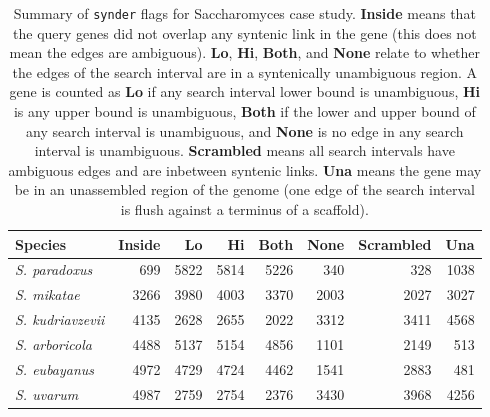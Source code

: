 \begin{table}[!h]
  \centering
  \caption{Summary of {\tt synder} flags for Saccharomyces case study.
  \textbf{Inside} means that the query genes did not overlap any syntenic link
  in the gene (this does not mean the edges are ambiguous).  \textbf{Lo},
  \textbf{Hi}, \textbf{Both}, and \textbf{None} relate to whether the edges of
  the search interval are in a syntenically unambiguous region. A gene is
  counted as \textbf{Lo} if any search interval lower bound is unambiguous,
  \textbf{Hi} is any upper bound is unambiguous, \textbf{Both} if the lower and
  upper bound of any search interval is unambiguous, and \textbf{None} is no
  edge in any search interval is unambiguous.  \textbf{Scrambled} means all
  search intervals have ambiguous edges and are inbetween syntenic links.
  \textbf{Una} means the gene may be in an unassembled region of the genome
  (one edge of the search interval is flush against a terminus of a scaffold).}
  \label{tab:synder-flag-summary}
  \begin{tabular}{l | r | rrrr | r | r}
    Species                  & Inside & Lo   & Hi   & Both & None  & Scrambled & Una   \\
    \hline                                                         
    \textit{S. paradoxus}    & 699    & 5822 & 5814 & 5226 & 340   & 328        & 1038  \\
    \textit{S. mikatae}      & 3266   & 3980 & 4003 & 3370 & 2003  & 2027       & 3027  \\
    \textit{S. kudriavzevii} & 4135   & 2628 & 2655 & 2022 & 3312  & 3411       & 4568  \\
    \textit{S. arboricola}   & 4488   & 5137 & 5154 & 4856 & 1101  & 2149       & 513   \\
    \textit{S. eubayanus}    & 4972   & 4729 & 4724 & 4462 & 1541  & 2883       & 481   \\
    \textit{S. uvarum}       & 4987   & 2759 & 2754 & 2376 & 3430  & 3968       & 4256 
  \end{tabular}
\end{table}

